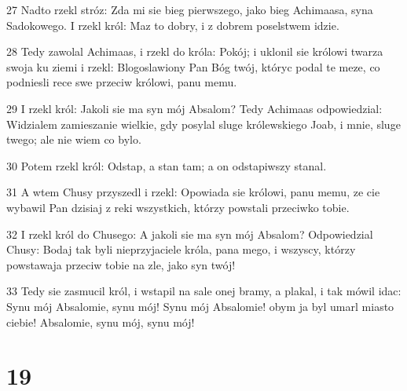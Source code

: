 \par 27 Nadto rzekl stróz: Zda mi sie bieg pierwszego, jako bieg Achimaasa, syna Sadokowego. I rzekl król: Maz to dobry, i z dobrem poselstwem idzie.
\par 28 Tedy zawolal Achimaas, i rzekl do króla: Pokój; i uklonil sie królowi twarza swoja ku ziemi i rzekl: Blogoslawiony Pan Bóg twój, któryc podal te meze, co podniesli rece swe przeciw królowi, panu memu.
\par 29 I rzekl król: Jakoli sie ma syn mój Absalom? Tedy Achimaas odpowiedzial: Widzialem zamieszanie wielkie, gdy posylal sluge królewskiego Joab, i mnie, sluge twego; ale nie wiem co bylo.
\par 30 Potem rzekl król: Odstap, a stan tam; a on odstapiwszy stanal.
\par 31 A wtem Chusy przyszedl i rzekl: Opowiada sie królowi, panu memu, ze cie wybawil Pan dzisiaj z reki wszystkich, którzy powstali przeciwko tobie.
\par 32 I rzekl król do Chusego: A jakoli sie ma syn mój Absalom? Odpowiedzial Chusy: Bodaj tak byli nieprzyjaciele króla, pana mego, i wszyscy, którzy powstawaja przeciw tobie na zle, jako syn twój!
\par 33 Tedy sie zasmucil król, i wstapil na sale onej bramy, a plakal, i tak mówil idac: Synu mój Absalomie, synu mój! Synu mój Absalomie! obym ja byl umarl miasto ciebie! Absalomie, synu mój, synu mój!

\chapter{19}

